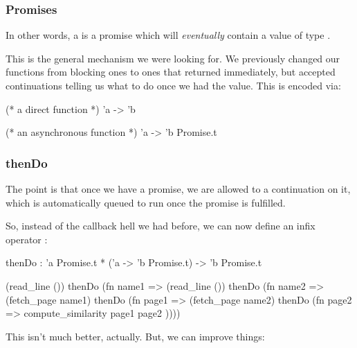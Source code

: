 \documentclass[aspectratio=169]{beamer}
\begin{document}
\begin{frame}[fragile]
  \frametitle{Promises}


  \pause
  \vspace{\fill}

  In other words, a  is a promise which will
  \textit{eventually} contain a value of type .

  \pause
  \vspace{\fill}

  This is the general mechanism we were looking for. We previously
  changed our functions from blocking ones to ones that returned immediately,
  but accepted continuations telling us what to do once we had the value.
  This is encoded via:

  \begin{codeblock}
    (* a direct function *)
    'a -> 'b

    (* an asynchronous function *)
    'a -> 'b Promise.t
\end{codeblock}
\end{frame}

\begin{frame}[fragile]
  \frametitle{thenDo}

  The point is that once we have a promise, we are allowed to
   a continuation on it, which is automatically
  queued to run once the promise is fulfilled.

  \pause
  \vspace{\fill}

  So, instead of the callback hell we had before, we can now define
  an infix operator :
  \begin{codeblock}
    thenDo : 'a Promise.t * ('a -> 'b Promise.t) -> 'b Promise.t
\end{codeblock}

  \pause
  \vspace{\fill}

  \begin{codeblock}
    (read_line ()) thenDo (fn name1 =>
    (read_line ()) thenDo (fn name2 =>
    (fetch_page name1) thenDo (fn page1 =>
    (fetch_page name2) thenDo (fn page2 =>
    compute_similarity page1 page2
    ))))
\end{codeblock}

  \pause
  \vspace{\fill}

  This isn't much better, actually. But, we can improve things:
\end{frame}
\end{document}
